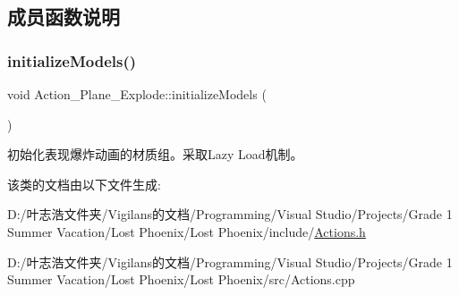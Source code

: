 \subsection{成员函数说明}
\mbox{\label{class_action___plane___explode_a797e8de15934ea7370086bde4cc45015}} 
\subsubsection{\texorpdfstring{initialize\+Models()}{initializeModels()}}
{\footnotesize\ttfamily void Action\+\_\+\+Plane\+\_\+\+Explode\+::initialize\+Models (\begin{DoxyParamCaption}{ }\end{DoxyParamCaption})\hspace{0.3cm}{\ttfamily [static]}}



初始化表现爆炸动画的材质组。采取\+Lazy Load机制。 



该类的文档由以下文件生成\+:\begin{DoxyCompactItemize}
\item 
D\+:/叶志浩文件夹/\+Vigilans的文档/\+Programming/\+Visual Studio/\+Projects/\+Grade 1 Summer Vacation/\+Lost Phoenix/\+Lost Phoenix/include/\hyperlink{_actions_8h}{Actions.\+h}\item 
D\+:/叶志浩文件夹/\+Vigilans的文档/\+Programming/\+Visual Studio/\+Projects/\+Grade 1 Summer Vacation/\+Lost Phoenix/\+Lost Phoenix/src/Actions.\+cpp\end{DoxyCompactItemize}

